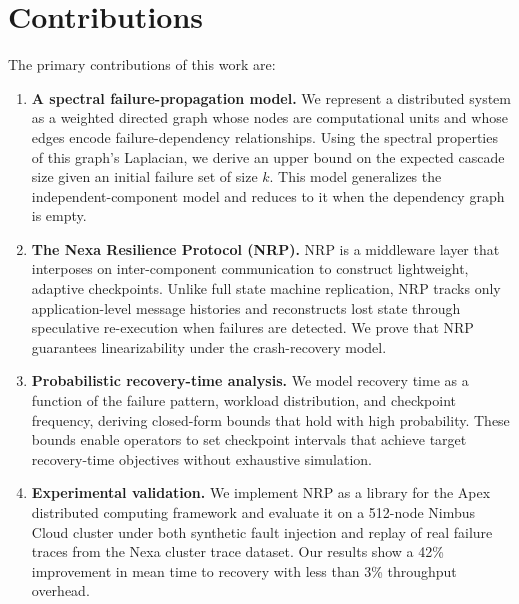 \section{Contributions}

The primary contributions of this work are:

\begin{enumerate}[label=\textbf{C\arabic*:},leftmargin=*,itemsep=6pt]
  \item \textbf{A spectral failure-propagation model.} We represent a distributed system as a weighted directed graph whose nodes are computational units and whose edges encode failure-dependency relationships. Using the spectral properties of this graph's Laplacian, we derive an upper bound on the expected cascade size given an initial failure set of size $k$. This model generalizes the independent-component model and reduces to it when the dependency graph is empty.
  
  \item \textbf{The Nexa Resilience Protocol (NRP).} NRP is a middleware layer that interposes on inter-component communication to construct lightweight, adaptive checkpoints. Unlike full state machine replication, NRP tracks only application-level message histories and reconstructs lost state through speculative re-execution when failures are detected. We prove that NRP guarantees linearizability under the crash-recovery model.
  
  \item \textbf{Probabilistic recovery-time analysis.} We model recovery time as a function of the failure pattern, workload distribution, and checkpoint frequency, deriving closed-form bounds that hold with high probability. These bounds enable operators to set checkpoint intervals that achieve target recovery-time objectives without exhaustive simulation.
  
  \item \textbf{Experimental validation.} We implement NRP as a library for the Apex distributed computing framework and evaluate it on a 512-node Nimbus Cloud cluster under both synthetic fault injection and replay of real failure traces from the Nexa cluster trace dataset. Our results show a 42\% improvement in mean time to recovery with less than 3\% throughput overhead.
\end{enumerate}
